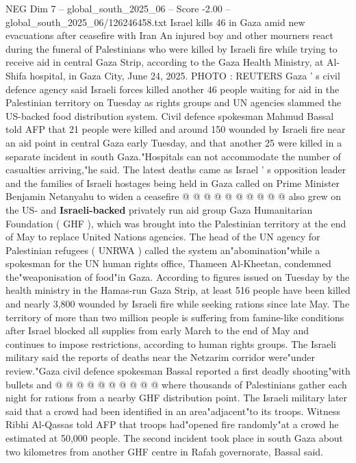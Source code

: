 \begin{textsample}{NEG Dim 7 – global\_south\_2025\_06 – Score -2.00 – global\_south\_2025\_06/126246458.txt}  \label{ex:f7_neg_060}
Israel kills 46 in Gaza amid new evacuations after ceasefire with Iran An injured boy and other mourners react during the funeral of Palestinians who were killed by Israeli fire while trying to receive aid in central Gaza Strip, according to the Gaza Health Ministry, at Al-Shifa hospital, in Gaza City, June 24, 2025.
PHOTO : REUTERS Gaza ' s civil defence agency said Israeli forces killed another 46 people waiting for aid in the Palestinian territory on Tuesday as rights groups and UN agencies slammed the US-backed food distribution system.
Civil defence spokesman Mahmud Bassal told AFP that 21 people were killed and around 150 wounded by Israeli fire near an aid point in central Gaza early Tuesday, and that another 25 were killed in a separate incident in south Gaza."Hospitals can not accommodate the number of casualties arriving,"he said.
The latest deaths came as Israel ' s opposition leader and the families of Israeli hostages being held in Gaza called on Prime Minister Benjamin Netanyahu to widen a ceasefire @ @ @ @ @ @ @ @ @ @ also grew on the US- and \textbf{Israeli-backed} privately run aid group Gaza Humanitarian Foundation ( GHF ), which was brought into the Palestinian territory at the end of May to replace United Nations agencies.
The head of the UN agency for Palestinian refugees ( UNRWA ) called the system an"abomination"while a spokesman for the UN human rights office, Thameen Al-Kheetan, condemned the"weaponisation of food"in Gaza.
According to figures issued on Tuesday by the health ministry in the Hamas-run Gaza Strip, at least 516 people have been killed and nearly 3,800 wounded by Israeli fire while seeking rations since late May.
The territory of more than two million people is suffering from famine-like conditions after Israel blocked all supplies from early March to the end of May and continues to impose restrictions, according to human rights groups.
The Israeli military said the reports of deaths near the Netzarim corridor were"under review."Gaza civil defence spokesman Bassal reported a first deadly shooting"with bullets and @ @ @ @ @ @ @ @ @ @ where thousands of Palestinians gather each night for rations from a nearby GHF distribution point.
The Israeli military later said that a crowd had been identified in an area"adjacent"to its troops.
Witness Ribhi Al-Qassas told AFP that troops had"opened fire randomly"at a crowd he estimated at 50,000 people.
The second incident took place in south Gaza about two kilometres from another GHF centre in Rafah governorate, Bassal said.

\end{textsample}
